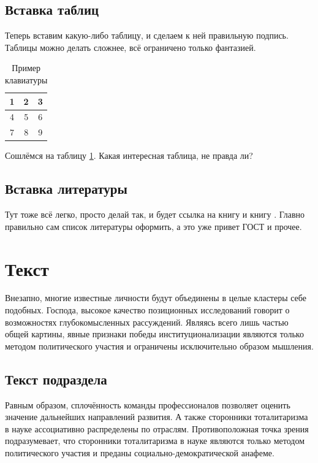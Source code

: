 \documentclass[a4paper, 12pt]{article}
\begin{document}
\subsection{Вставка таблиц}
Теперь вставим какую-либо таблицу, и сделаем к ней правильную подпись. Таблицы можно делать сложнее, всё ограничено только фантазией.
\begin{table}[h]
    \begin{center}
        \begin{tabular}{|c|c|c|}
            \hline
            1 & 2 & 3 \\
            \hline
            4 & 5 & 6 \\
            \hline
            7 & 8 & 9 \\
            \hline
        \end{tabular}
    \end{center}
    \caption{\label{keypad}Пример клавиатуры}
\end{table}

Сошлёмся на таблицу \ref{keypad}. Какая интересная таблица, не правда ли?

\subsection{Вставка литературы}
Тут тоже всё легко, просто делай так, и будет ссылка на книгу \cite{book1} и книгу \cite{book2}.
Главно правильно сам список литературы оформить, а это уже привет ГОСТ и прочее.

\section{Текст}
Внезапно, многие известные личности будут объединены в целые кластеры себе подобных. Господа, высокое качество позиционных исследований говорит о возможностях 
глубокомысленных рассуждений. Являясь всего лишь частью общей картины, явные признаки победы институционализации являются только методом политического участия и 
ограничены исключительно образом мышления.

\subsection{Текст подраздела}
Равным образом, сплочённость команды профессионалов позволяет оценить значение дальнейших направлений развития. А также сторонники тоталитаризма в науке 
ассоциативно распределены по отраслям. Противоположная точка зрения подразумевает, что сторонники тоталитаризма в науке являются только методом политического участия 
и преданы социально-демократической анафеме.
\end{document}
